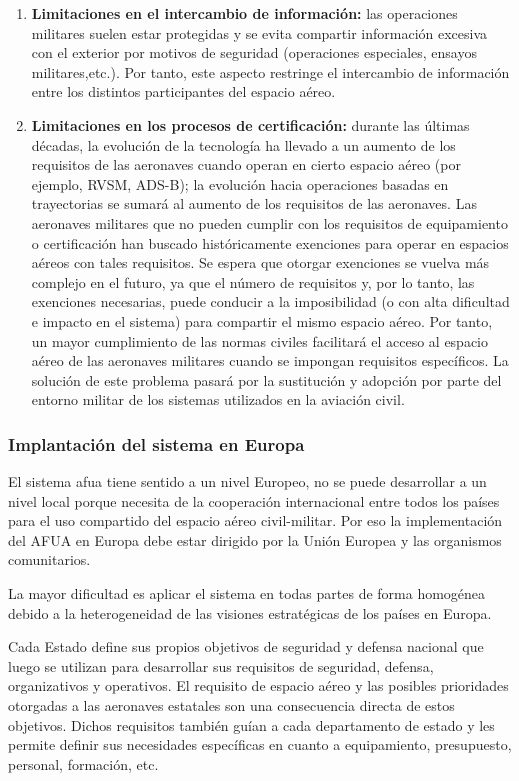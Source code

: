 \begin{enumerate}
    \item \textbf{Limitaciones en el intercambio de información:} las operaciones militares suelen estar protegidas y se evita compartir información excesiva con el exterior por motivos de seguridad (operaciones especiales, ensayos militares,etc.).  Por tanto, este aspecto restringe el intercambio de información entre los distintos participantes del espacio aéreo. 
    
    \item \textbf{Limitaciones en los procesos de certificación:} durante las últimas décadas, la evolución de la tecnología ha llevado a un aumento de los requisitos de las aeronaves cuando operan en cierto espacio aéreo (por ejemplo, RVSM, ADS-B); la evolución hacia operaciones basadas en trayectorias se sumará al aumento de los requisitos de las aeronaves. Las aeronaves militares que no pueden cumplir con los requisitos de equipamiento o certificación han buscado históricamente exenciones para operar en espacios aéreos con tales requisitos. Se espera que otorgar exenciones se vuelva más complejo en el futuro, ya que el número de requisitos y, por lo tanto, las exenciones necesarias, puede conducir a la imposibilidad (o con alta dificultad e impacto en el sistema) para compartir el mismo espacio aéreo. Por tanto, un mayor cumplimiento de las normas civiles facilitará el acceso al espacio aéreo de las aeronaves militares cuando se impongan requisitos específicos. La solución de este problema pasará por la sustitución y adopción por parte del entorno militar de los sistemas utilizados en la aviación civil.
\end{enumerate}

\subsubsection{Implantación del sistema en Europa}

El sistema \acrfull{afua} tiene sentido a un nivel Europeo, no se puede desarrollar a un nivel local porque necesita de la cooperación internacional entre todos los países para el uso compartido del espacio aéreo civil-militar. Por eso la implementación del AFUA en Europa debe estar dirigido por la Unión Europea y las organismos comunitarios. 

La mayor dificultad es aplicar el sistema en todas partes de forma homogénea debido a la heterogeneidad de las visiones estratégicas de los países en Europa.

Cada Estado define sus propios objetivos de seguridad y defensa nacional que luego se utilizan para desarrollar sus requisitos de seguridad, defensa, organizativos y operativos. El requisito de espacio aéreo y las posibles prioridades otorgadas a las aeronaves estatales son una consecuencia directa de estos objetivos. Dichos requisitos también guían a cada departamento de estado y les permite definir sus necesidades específicas en cuanto a equipamiento, presupuesto, personal, formación, etc.

